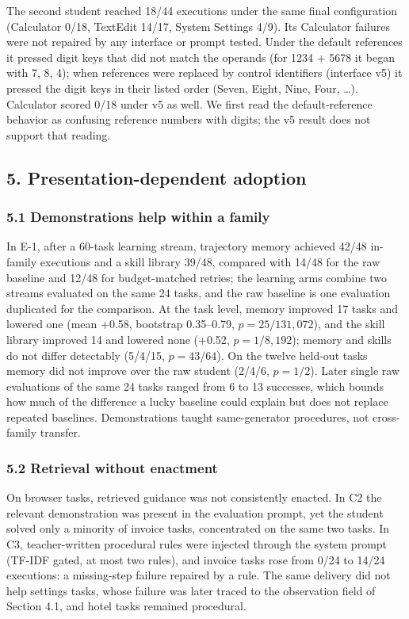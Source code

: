 \documentclass[
  10pt,
]{article}
\newcounter{none} %
\begin{document}
The second student reached 18/44 executions under the same final
configuration (Calculator 0/18, TextEdit 14/17, System Settings 4/9).
Its Calculator failures were not repaired by any interface or prompt
tested. Under the default references it pressed digit keys that did not
match the operands (for 1234 + 5678 it began with 7, 8, 4); when
references were replaced by control identifiers (interface v5) it
pressed the digit keys in their listed order (Seven, Eight, Nine, Four,
\ldots). Calculator scored 0/18 under v5 as well. We first read the
default-reference behavior as confusing reference numbers with digits;
the v5 result does not support that reading.

\subsection{5. Presentation-dependent
adoption}\label{presentation-dependent-adoption}

\subsubsection{5.1 Demonstrations help within a
family}\label{demonstrations-help-within-a-family}

In E-1, after a 60-task learning stream, trajectory memory achieved
42/48 in-family executions and a skill library 39/48, compared with
14/48 for the raw baseline and 12/48 for budget-matched retries; the
learning arms combine two streams evaluated on the same 24 tasks, and
the raw baseline is one evaluation duplicated for the comparison. At the
task level, memory improved 17 tasks and lowered one (mean +0.58,
bootstrap 0.35--0.79, \(p=25/131{,}072\)), and the skill library
improved 14 and lowered none (+0.52, \(p=1/8{,}192\)); memory and skills
do not differ detectably (5/4/15, \(p=43/64\)). On the twelve held-out
tasks memory did not improve over the raw student (2/4/6, \(p=1/2\)).
Later single raw evaluations of the same 24 tasks ranged from 6 to 13
successes, which bounds how much of the difference a lucky baseline
could explain but does not replace repeated baselines. Demonstrations
taught same-generator procedures, not cross-family transfer.

\subsubsection{5.2 Retrieval without
enactment}\label{retrieval-without-enactment}

On browser tasks, retrieved guidance was not consistently enacted. In C2
the relevant demonstration was present in the evaluation prompt, yet the
student solved only a minority of invoice tasks, concentrated on the
same two tasks. In C3, teacher-written procedural rules were injected
through the system prompt (TF-IDF gated, at most two rules), and invoice
tasks rose from 0/24 to 14/24 executions: a missing-step failure
repaired by a rule. The same delivery did not help settings tasks, whose
failure was later traced to the observation field of Section 4.1, and
hotel tasks remained procedural.
\end{document}
